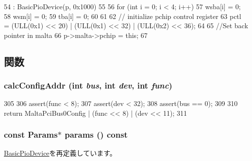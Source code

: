 \begin{DoxyCode}
54     : BasicPioDevice(p, 0x1000)
55 {
56     for (int i = 0; i < 4; i++) {
57         wsba[i] = 0;
58         wsm[i] = 0;
59         tba[i] = 0;
60     }
61 
62     // initialize pchip control register
63     pctl = (ULL(0x1) << 20) | (ULL(0x1) << 32) | (ULL(0x2) << 36);
64 
65     //Set back pointer in malta
66     p->malta->pchip = this;
67 }
\end{DoxyCode}


\subsection{関数}
\hypertarget{classMaltaPChip_ac58937201c28a74230a03b39b03066b6}{
\subsubsection[{calcConfigAddr}]{ calcConfigAddr (int {\em bus}, \/  int {\em dev}, \/  int {\em func})}}
\label{classMaltaPChip_ac58937201c28a74230a03b39b03066b6}



\begin{DoxyCode}
305 {
306     assert(func < 8);
307     assert(dev < 32);
308     assert(bus == 0);
309 
310     return MaltaPciBus0Config | (func << 8) | (dev << 11);
311 }
\end{DoxyCode}
\hypertarget{classMaltaPChip_acd3c3feb78ae7a8f88fe0f110a718dff}{
\subsubsection[{params}]{\setlength{\rightskip}{0pt plus 5cm}const {\bf Params}$\ast$ params () const}}
\label{classMaltaPChip_acd3c3feb78ae7a8f88fe0f110a718dff}


\hyperlink{classBasicPioDevice_acd3c3feb78ae7a8f88fe0f110a718dff}{BasicPioDevice}を再定義しています。


